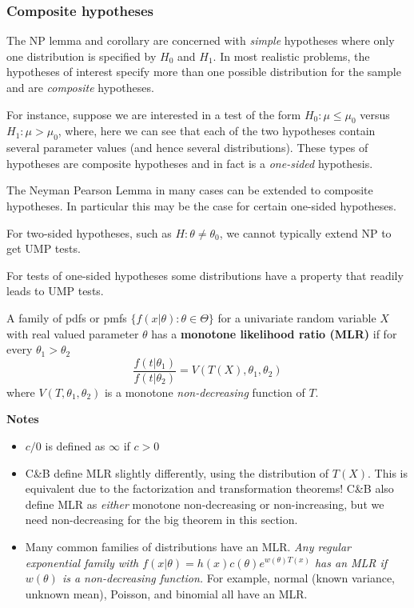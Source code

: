 \documentclass[11pt,]{article}
\providecommand{\tightlist}{%
  \setlength{\itemsep}{0pt}\setlength{\parskip}{0pt}}
\begin{document}
\newpage

\hypertarget{composite-hypotheses}{%
\subsubsection{Composite hypotheses}\label{composite-hypotheses}}

The NP lemma and corollary are concerned with \emph{simple} hypotheses
where only one distribution is specified by \(H_0\) and \(H_1\). In most
realistic problems, the hypotheses of interest specify more than one
possible distribution for the sample and are \emph{composite}
hypotheses.

For instance, suppose we are interested in a test of the form
\(H_0: \mu \leq \mu_0\) versus \(H_1: \mu > \mu_0\), where, here we can
see that each of the two hypotheses contain several parameter values
(and hence several distributions). These types of hypotheses are
composite hypotheses and in fact is a \emph{one-sided} hypothesis.

The Neyman Pearson Lemma in many cases can be extended to composite
hypotheses. In particular this may be the case for certain one-sided
hypotheses.

For two-sided hypotheses, such as \(H: \theta \neq \theta_0\), we cannot
typically extend NP to get UMP tests.

For tests of one-sided hypotheses some distributions have a property
that readily leads to UMP tests.

 A family of pdfs or pmfs
\(\{ f(x|\theta): \theta \in \Theta\}\) for a univariate random variable
\(X\) with real valued parameter \(\theta\) has a
\textbf{monotone likelihood ratio (MLR)} if for every
\(\theta_1 > \theta_2\)
\[ \frac{f(t|\theta_1)}{f(t|\theta_2)} = V(T(X), \theta_1, \theta_2)\]
where \(V(T, \theta_1, \theta_2)\) is a monotone \emph{non-decreasing}
function of \(T\).

\textbf{Notes}

\begin{itemize}
\tightlist
\item
  \(c/0\) is defined as \(\infty\) if \(c>0\)
\item
  C\&B define MLR slightly differently, using the distribution of
  \(T(X)\). This is equivalent due to the factorization and
  transformation theorems! C\&B also define MLR as \emph{either}
  monotone non-decreasing or non-increasing, but we need non-decreasing
  for the big theorem in this section.
\item
  Many common families of distributions have an MLR. \emph{Any regular
  exponential family with
  \(f(x|\theta) = h(x) c(\theta) e^{w(\theta) T(x)}\) has an MLR if
  \(w(\theta)\) is a non-decreasing function.} For example, normal
  (known variance, unknown mean), Poisson, and binomial all have an MLR.
\end{itemize}
\end{document}
